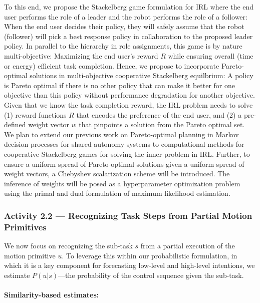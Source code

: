 \documentclass[letterpaper, 11 pt, onecolumn]{article}
\begin{document}
To this end, we propose the Stackelberg game formulation for IRL where the end user performs the role of a leader and the robot performs the role of a follower: When the end user decides their policy, they will safely assume that the robot (follower) will pick a best response policy
in collaboration to the proposed leader policy. In parallel to the hierarchy in role assignments, this game is by nature multi-objective: Maximizing the end user's reward $R$ while ensuring overall (time or energy) efficient task completion. Hence, we propose to incorporate
Pareto-optimal solutions in multi-objective cooperative
Stackelberg equilbrium: A policy is Pareto optimal if there is no
other policy that can make it better for one objective than this
policy without performance degradation for another objective. Given that we know the task completion reward, the IRL problem needs to solve (1)
reward functions $R$ that encodes the preference of the end user,
and (2) a pre-defined weight vector $w$ that pinpoints a solution
from the Pareto optimal set. We plan to extend our previous work on Pareto-optimal planning in Markov decision processes for shared autonomy systems \cite{fu2016synthesis} to computational methods for cooperative Stackelberg games \cite{vorobeychik2012computing,cermak2016using} for solving the inner problem in IRL. Further, to ensure a uniform spread of Pareto-optimal solutions given a uniform spread of weight vectors, a Chebyshev scalarization scheme \cite{perny2010finding} will be introduced. The inference of weights will be posed as a hyperparameter optimization problem using the primal and dual formulation of maximum likelihood estimation. %


\subsubsection{Activity 2.2 --- Recognizing Task Steps from Partial Motion Primitives}\label{sec:plan-intent-prediction}

We now focus on recognizing the sub-task $s$ from a partial execution of the motion primitive $u$. To leverage this within our probabilistic formulation, in which it is a key component for forecasting low-level and high-level intentions, we estimate $P(u|s)$---the probability of the control sequence given the sub-task.

\paragraph{Similarity-based estimates:}
\end{document}
